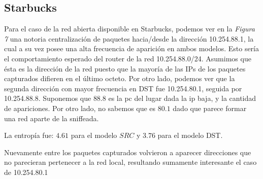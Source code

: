\FloatBarrier

\subsection{Starbucks}

Para el caso de la red abierta disponible en Starbucks, podemos ver en la 
\emph{Figura 7} una notoria centralizaci\'on de paquetes hacia/desde la direcci\'on
10.254.88.1, la cual a su vez posee una alta frecuencia de aparici\'on en ambos
modelos. Esto ser\'ia el comportamiento esperado del router de la red
10.254.88.0/24. Asumimos que \'esta es la direcci\'on de la red puesto que 
la mayor\'ia de las IPs de los paquetes capturados difieren en el \'ultimo octeto.
Por otro lado, podemos ver que la segunda direcci\'on con mayor frecuencia en DST
fue 10.254.80.1, seguida por 10.254.88.8. Suponemos que $88.8$ es la pc del lugar
dada la ip baja, y la cantidad de apariciones. Por otro lado, no sabemos que es
$80.1$ dado que parece formar una red aparte de la sniffeada.

La entrop\'ia fue: $4.61$ para el modelo $SRC$ y $3.76$ para el modelo
DST.

Nuevamente entre los paquetes capturados volvieron a aparecer direcciones que
no parecieran pertenecer a la red local, resultando sumamente interesante el caso
de 10.254.80.1


